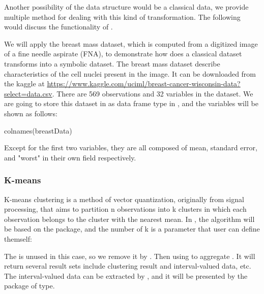 \documentclass[article]{jss}
\begin{document}
Another possibility of the data structure would be a classical data, we provide multiple method for dealing with this kind of transformation. The following would discuss the functionality of .

We will apply the breast mass dataset, which is computed from a digitized image of a fine needle aspirate (FNA), to demonstrate how does a classical dataset transforms into a symbolic dataset. The breast mass dataset describe characteristics of the cell nuclei present in the image. It can be downloaded from the kaggle at \url{https://www.kaggle.com/uciml/breast-cancer-wisconsin-data?select=data.csv}. There are 569 observations and 32 variables in the dataset. We are going to store this dataset in  as data frame type in , and the variables will be shown as follows:

\begin{CodeChunk}
\begin{CodeInput}
colnames(breastData)
\end{CodeInput}
\end{CodeChunk}

Except for the first two variables, they are all composed of mean, standard error, and "worst" in their own field respectively.


\subsubsection{K-means}

K-means clustering is a method of vector quantization, originally from signal processing, that aims to partition n observations into k clusters in which each observation belongs to the cluster with the nearest mean. In , the algorithm will be based on the  package, and the number of k is a parameter that user can define themself:

\begin{CodeChunk}
\end{CodeChunk}

The  is unused in this case, so we remove it by  \cite{dplyr}. Then using  to aggregate . It will return several result sets include clustering result and interval-valued data, etc. The interval-valued data can be extracted by , and it will be presented by the package of  type.
\end{document}
